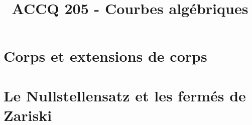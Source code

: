 \documentclass[a4paper,9pt]{article}
\title{\vspace{-1.2cm} ACCQ 205 - Courbes algébriques}
\begin{document}
\maketitle

\vspace{-1.5cm}

\section{Corps et extensions de corps}
	

\section{Le Nullstellensatz et les fermés de Zariski}
	
\end{document}
